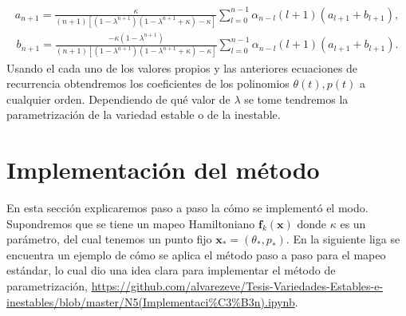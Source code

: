\begin{eqnarray}
a_{n+1}=\frac{\kappa}{(n+1)[(1-\lambda^{n+1})(1-\lambda^{n+1}+\kappa)-\kappa]}\sum_{l=0}^{n-1}\alpha_{n-l}(l+1)(a_{l+1}+b_{l+1}),
\end{eqnarray}
\begin{eqnarray}
b_{n+1}=\frac{-\kappa(1-\lambda^{n+1})}{(n+1)[(1-\lambda^{n+1})(1-\lambda^{n+1}+\kappa)-\kappa]}\sum_{l=0}^{n-1}\alpha_{n-l}(l+1)(a_{l+1}+b_{l+1}).
\end{eqnarray}
Usando el cada uno de los valores propios y las anteriores ecuaciones de recurrencia obtendremos los coeficientes de los polinomios $\theta(t),p(t)$ a cualquier orden. Dependiendo de qué valor de $\lambda$ se tome tendremos la parametrización de la variedad estable o de la inestable.\\






\section{Implementación del método}
En esta sección explicaremos paso a paso la cómo se implementó el modo. Supondremos que se tiene un mapeo Hamiltoniano $\mathbf{f}_{k}(\mathbf{x})$ donde $\kappa$  es un parámetro, del cual tenemos un punto fijo $\mathbf{x}_{*}=(\theta_{*},p_{*})$. En la siguiente liga se encuentra un ejemplo de cómo se aplica el método paso a paso para el mapeo estándar, lo cual dio una idea clara para implementar el método de parametrización, \url{https://github.com/alvarezeve/Tesis-Variedades-Estables-e-inestables/blob/master/N5(Implementaci%C3%B3n).ipynb}. 
\linebreak


